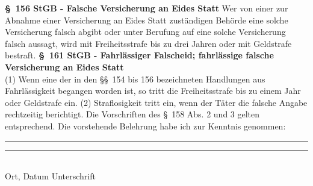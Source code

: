 \newline
\textbf{\S\ 156 StGB - Falsche Versicherung an Eides Statt}\newline
Wer von einer zur Abnahme einer Versicherung an Eides Statt zuständigen Behörde eine solche Versicherung falsch abgibt oder unter Berufung auf eine solche Versicherung falsch aussagt, wird mit Freiheitsstrafe bis zu drei Jahren oder mit Geldstrafe bestraft.\newline\newline
\textbf{\S\ 161 StGB - Fahrlässiger Falscheid; fahrlässige falsche Versicherung an Eides Statt}\\
(1) Wenn eine der in den \S\S\ 154 bis 156 bezeichneten Handlungen aus Fahrlässigkeit begangen worden ist, so tritt die Freiheitsstrafe bis zu einem Jahr oder Geldstrafe ein.
(2) Straflosigkeit tritt ein, wenn der Täter die falsche Angabe rechtzeitig berichtigt. Die Vorschriften des \S\ 158 Abs. 2 und 3 gelten entsprechend.\newline
\newline
Die vorstehende Belehrung habe ich zur Kenntnis genommen:\newline
\newline
\rule{6cm}{1pt} \hspace{1.21cm} \rule{6cm}{1pt}\\
\footnotesize{Ort, Datum}\hspace{5.55cm}
\footnotesize{Unterschrift}
